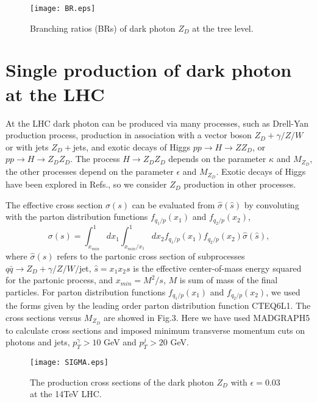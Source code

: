 \documentclass{article}
\begin{document}
\begin{figure}
\begin{center}
\texttt{[image: BR.eps]}
\caption{Branching ratios (BRs) of dark photon $Z_D$ at the tree level. }
\end{center}
\end{figure}



 \section{Single production of dark photon  at  the LHC}

	At the LHC  dark  photon can be produced  via many processes, such as Drell-Yan production process, production in association with a vector boson $Z_D+\gamma/Z/W$ or with jets $Z_D+$jets, and exotic decays of Higgs $pp\rightarrow H\rightarrow ZZ_D$, or $pp\rightarrow H\rightarrow Z_DZ_D$. The  process $H\rightarrow Z_DZ_D$ depends on the parameter  $\kappa $ and $M_{Z_D}$, the other processes depend on the parameter $\epsilon$ and $M_{Z_D}$. Exotic decays of Higgs  have been explored in Refs.\cite{0801.3456,1405.5196,1405.7691,1408.1075,1312.4992,1603.01377, 1412.0018}, so we consider $Z_D$ production in other processes.
	
	 The effective cross section $\sigma\left(s\right)$ can be evaluated from $\hat{\sigma}\left(\hat{s}\right)$ by convoluting with the parton distribution functions $f_{q_1/p}\left(x_1\right)$ and $f_{q_2/p}\left(x_2\right)$,
 \begin{equation}
 \sigma\left(s\right)=\int^1_{x_{min}}dx_1\int^1_{x_{min}/x_1}dx_2f_{q_1/p}\left(x_1\right)f_{q_2/p}\left(x_2\right)
 \hat{\sigma}\left(\hat{s}\right),\end{equation}
where $\hat{\sigma}\left(\hat{s}\right)$ refers to the partonic cross section of subprocesses $q\bar{q}\rightarrow Z_D+\gamma/Z/W/$jet, $\hat{s}=x_1x_2s$ is the effective center-of-mass energy squared for the partonic process, and $x_{min}=M^2/s$, $M$ is sum of mass of the final particles.
For parton distribution functions $f_{q_1/p}\left(x_1\right)$ and $f_{q_2/p}\left(x_2\right)$, we used the forms given by the leading order parton distribution function CTEQ6L1\cite{CTEQ}. The cross sections versus $M_{Z_D}$ are showed in Fig.3. Here we have used MADGRAPH5\cite{MG5} to calculate cross sections and imposed minimum transverse momentum cuts on photons and jets,  $p_T^{\gamma}>10 $ GeV and $p_T^j>20 $ GeV.
\begin{figure}
\begin{center}
\texttt{[image: SIGMA.eps]}
\caption{The production cross sections of the dark photon $Z_D$ with $\epsilon=0.03$ at the 14TeV LHC. }
\end{center}
\end{figure}
\end{document}
